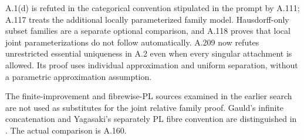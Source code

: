 A.1(d) is refuted in the categorical convention stipulated in the prompt
by A.111; A.117 treats the additional locally parameterized family model.
Hausdorff-only subset families are a separate optional comparison, and
A.118 proves that local joint parameterizations do not follow automatically.
A.209 now refutes unrestricted essential uniqueness in A.2 even when every
singular attachment is allowed. Its proof uses individual approximation
and uniform separation, without a parametric approximation assumption.


The finite-improvement and fibrewise-PL sources examined in the earlier
search are not used as substitutes for the joint relative family proof.
Gauld's infinite concatenation and Yagasaki's separately PL fibre
convention are distinguished in
\cite{Gauld1976,Yagasaki1997}. The actual comparison is A.160.

